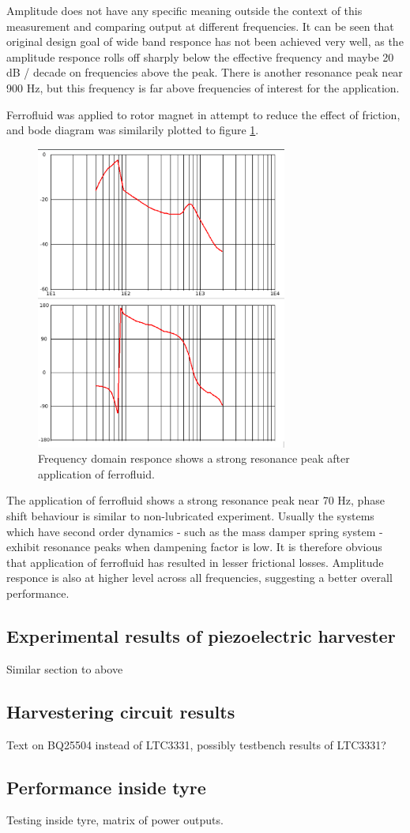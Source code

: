 Amplitude does not have any specific meaning outside the context of this measurement and comparing output at different frequencies. It can be seen that original design goal of wide band responce has not been achieved very well, as the amplitude responce rolls off sharply below the effective frequency and maybe 20 dB / decade on frequencies above the peak. There is another resonance peak near 900 Hz, but this frequency is far above frequencies of interest for the application. 

Ferrofluid was applied to rotor magnet in attempt to reduce the effect of friction, and bode diagram was similarily plotted to figure \ref{fig:inductive_bode_ferro}.

\begin{figure}[htb]
\begin{center}
\includegraphics[height=10cm]{images/own_measurement/generator_shaker/inductive_bode_ferro.png}
\end{center}
\caption{\label{fig:inductive_bode_ferro} Frequency domain responce shows a strong resonance peak after application of ferrofluid.}
\end{figure}

The application of ferrofluid shows a strong resonance peak near 70 Hz, phase shift behaviour is similar to non-lubricated experiment. Usually the systems which have second order dynamics - such as the mass damper spring system - exhibit resonance peaks when dampening factor is low. It is therefore obvious that application of ferrofluid has resulted in lesser frictional losses. Amplitude responce is also at higher level across all frequencies, suggesting a better overall performance. 

\subsection{Experimental results of piezoelectric harvester}
Similar section to above

\subsection{Harvestering circuit results }
Text on BQ25504 instead of LTC3331, possibly testbench results of LTC3331?

\subsection{Performance inside tyre}
Testing inside tyre, matrix of power outputs. 


